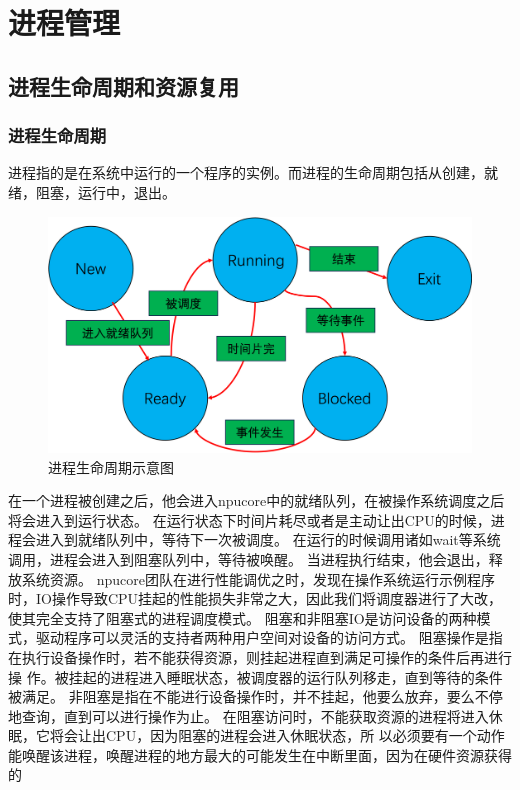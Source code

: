 \chapter{进程管理}
\section{进程生命周期和资源复用}
\subsection{进程生命周期}
进程指的是在系统中运行的一个程序的实例。而进程的生命周期包括从创建，就绪，阻塞，运行中，退出。
\begin{figure}[htb]
    \centering
    \includegraphics[width=\textwidth]{figures/05-01-进程生命周期示意图.png}
    \caption{
        进程生命周期示意图
    }
    \label{fig:user virtual process}
\end{figure}
在一个进程被创建之后，他会进入npucore中的就绪队列，在被操作系统调度之后将会进入到运行状态。
在运行状态下时间片耗尽或者是主动让出CPU的时候，进程会进入到就绪队列中，等待下一次被调度。
在运行的时候调用诸如wait等系统调用，进程会进入到阻塞队列中，等待被唤醒。
当进程执行结束，他会退出，释放系统资源。
npucore团队在进行性能调优之时，发现在操作系统运行示例程序时，IO操作导致CPU挂起的性能损失非常之大，因此我们将调度器进行了大改，使其完全支持了阻塞式的进程调度模式。
阻塞和非阻塞IO是访问设备的两种模式，驱动程序可以灵活的支持者两种用户空间对设备的访问方式。
阻塞操作是指在执行设备操作时，若不能获得资源，则挂起进程直到满足可操作的条件后再进行操
作。被挂起的进程进入睡眠状态，被调度器的运行队列移走，直到等待的条件被满足。
非阻塞是指在不能进行设备操作时，并不挂起，他要么放弃，要么不停地查询，直到可以进行操作为止。
在阻塞访问时，不能获取资源的进程将进入休眠，它将会让出CPU，因为阻塞的进程会进入休眠状态，所
以必须要有一个动作能唤醒该进程，唤醒进程的地方最大的可能发生在中断里面，因为在硬件资源获得的
